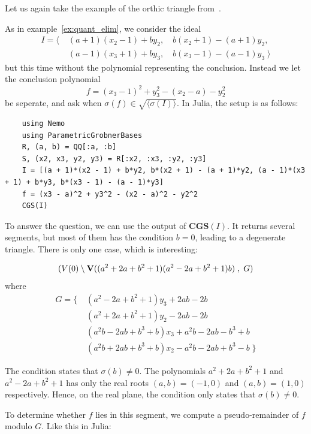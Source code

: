 Let us again take the example of the orthic triangle from~\cite{MONTES20101391}.


\begin{example} \upshape
  As in example~\ref{ex:quant_elim}, we consider the ideal
  \begin{align*}
    I = \langle\; &(a + 1)(x_{2} - 1) + b y_{2}, \quad  b(x_{2} + 1) - (a + 1)y_{2}, \\
                  &(a - 1)(x_{3} + 1) + b y_{3}, \quad  b(x_{3} - 1) - (a - 1)y_{3} \; \rangle
  \end{align*}
  but this time without the polynomial representing the conclusion. Instead we let the conclusion polynomial
  \[f = (x_{3} - 1)^{2} + y_{3}^{2} - (x_{2} - a) - y_{2}^{2}\]
  be seperate, and ask when $\sigma(f) \in \sqrt{\langle \sigma(I) \rangle}$. In Julia, the setup is as follows:

  \begin{verbatim}
    using Nemo
    using ParametricGrobnerBases
    R, (a, b) = QQ[:a, :b]
    S, (x2, x3, y2, y3) = R[:x2, :x3, :y2, :y3]
    I = [(a + 1)*(x2 - 1) + b*y2, b*(x2 + 1) - (a + 1)*y2, (a - 1)*(x3 + 1) + b*y3, b*(x3 - 1) - (a - 1)*y3]
    f = (x3 - a)^2 + y3^2 - (x2 - a)^2 - y2^2
    CGS(I)
  \end{verbatim}

  To answer the question, we can use the output of $\mathbf{CGS}(I)$. It returns several segments, but most of them has the condition $b = 0$, leading to a degenerate triangle. There is only one case, which is interesting:

  \[(V(0) \setminus \operatorname{\mathbf V}((a^{2} + 2a + b^{2} + 1)(a^{2} - 2a + b^{2} + 1)b)\;, \; G )\] where
  \begin{align*}
 G = \{\; &(a^2 - 2a + b^2 + 1)y_3 + 2ab - 2b \\
          &(a^2 + 2a + b^2 + 1)y_2 - 2ab - 2b \\
          &(a^2b - 2ab + b^3 + b)x_3 + a^2b - 2ab - b^3 + b \\
          &(a^2b + 2ab + b^3 + b)x_2 - a^2b - 2ab + b^3 - b \; \}
  \end{align*}

  The condition states that $\sigma(b) \neq 0$. The polynomials $a^{2} + 2a + b^{2} + 1$ and $a^{2} - 2a + b^{2} + 1$ has only the real roots $(a, b) = (-1, 0)$ and $(a, b) = (1, 0)$ respectively. Hence, on the real plane, the condition only states that $\sigma(b) \neq 0$.

  To determine whether $f$ lies in this segment, we compute a pseudo-remainder of $f$ modulo $G$. Like this in Julia:


\end{example}
